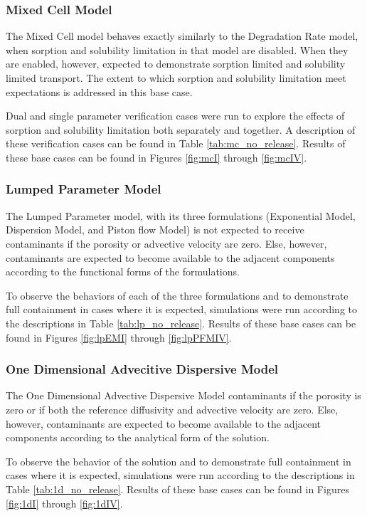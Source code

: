 \subsubsection{Mixed Cell Model}
The Mixed Cell model behaves exactly similarly to the Degradation Rate 
model, when sorption and solubility limitation in that model are disabled. When they are 
enabled, however, expected to demonstrate sorption limited and solubility 
limited transport. The extent to which sorption and solubility limitation meet 
expectations is addressed in this base case.

Dual and single parameter verification cases were run to explore the effects of sorption and 
solubility limitation both separately and together. A description of these verification 
cases can be found in Table \ref{tab:mc_no_release}. 
Results of these base cases can be found in Figures \ref{fig:mcI} through 
\ref{fig:mcIV}.



\clearpage

\subsubsection{Lumped Parameter Model}
The Lumped Parameter model, with its three formulations (Exponential Model, 
Dispersion Model, and Piston flow Model) is not expected to receive 
contaminants if the porosity or advective velocity are zero. Else, however, 
contaminants are expected to  become available to the adjacent components 
according to the functional forms of the formulations. 

To observe the behaviors of each of the three formulations and to demonstrate 
full containment in cases where it is expected, simulations were run
according to the descriptions in Table \ref{tab:lp_no_release}.
Results of these base cases can be found in Figures 
\ref{fig:lpEMI} through \ref{fig:lpPFMIV}.



\clearpage

\subsubsection{One Dimensional Advecitive Dispersive Model}
The One Dimensional Advective Dispersive Model contaminants if the porosity is 
zero or if both the reference diffusivity and advective velocity are zero. 
Else, however, contaminants are expected to  become available to the adjacent 
components according to the analytical form of the solution.

To observe the behavior of the solution and to demonstrate full containment in 
cases where it is expected, simulations were run according to the descriptions 
in Table \ref{tab:1d_no_release}.  Results of these base cases can be found in 
Figures \ref{fig:1dI} through \ref{fig:1dIV}.  



\clearpage
